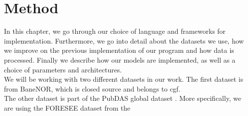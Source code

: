 \chapter{Method}
\label{chap:method}

In this chapter, we go through our choice of language and frameworks for implementation. Furthermore, we go into detail about the datasets we use, how we improve on the previous implementation of our program and how data is processed. Finally we describe how our models are implemented, as well as a choice of parameters and architectures. \\

We will be working with two different datasets in our work. The first dataset is from BaneNOR, which is closed source and belongs to \acrfull{cgf}. \\ 

The other dataset is part of the PubDAS global dataset \cite{spica2023pubdas}. More specifically, we are using the FORESEE dataset from the 









